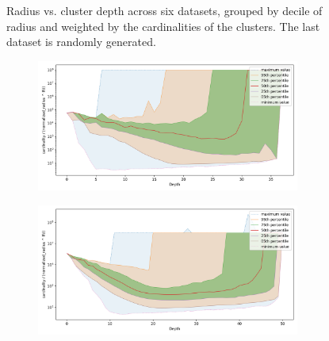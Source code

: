 \documentclass[review,supplement,onefignum,onetabnum]{siamonline220329}
\begin{document}
\begin{figure}[ht!]
\begin{subfigure}[b]{0.47\textwidth}
    \label{fig:results:random-radius}
    \end{subfigure}
    \vspace{1em}
    \caption{Radius vs. cluster depth across six datasets, grouped by decile of radius and weighted by the cardinalities of the clusters.
    The last dataset is randomly generated.}
    \label{fig:results:radius-plots}
\end{figure}

\begin{figure}[ht!]
    \begin{subfigure}[b]{0.47\textwidth}
    \includegraphics[width=0.95\textwidth]{images/fractal_density/fashion-mnist-60000.png}\\
    \label{fig:results:fashion-mnist-fractal_density}
    \end{subfigure}%
    \begin{subfigure}[b]{0.47\textwidth}
    \includegraphics[width=0.95\textwidth]{images/fractal_density/glove-25-1183514.png}\\
    \label{fig:results:glove-25-fractal_density}
    \end{subfigure}
    \vspace{1em}
    \\

\end{figure}
\end{document}
